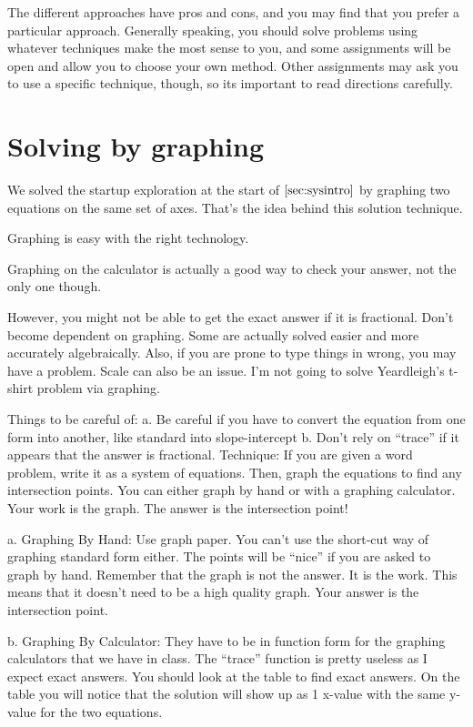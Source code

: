 The different approaches have pros and cons, and you may find that you prefer a particular approach. Generally speaking, you should solve problems using whatever techniques make the most sense to you, and some assignments will be open and allow you to choose your own method. Other assignments may ask you to use a specific technique, though, so its important to read directions carefully.

\section{Solving by graphing}
\label{sec:sysgraphing}

We solved the startup exploration at the start of $\cref{sec:sysintro}$ by graphing two equations on the same set of axes. That's the idea behind this solution technique.

Graphing is easy with the right technology.

Graphing on the calculator is actually a good way to check your answer, not the only one though.

However, you might not be able to get the exact answer if it is fractional. Don't become dependent on graphing. Some are actually solved easier and more accurately algebraically. Also, if you are prone to type things in wrong, you may have a problem. Scale can also be an issue. I'm not going to solve Yeardleigh's t-shirt problem via graphing.

Things to be careful of:
a. Be careful if you have to convert the equation from one form into another, like standard into slope-intercept
b. Don't rely on ``trace'' if it appears that the answer is fractional.
Technique: If you are given a word problem, write it as a system of equations. Then, graph the equations to find any intersection points. You can either graph by hand or with a graphing calculator. Your work is the graph. The answer is the intersection point!


a.
Graphing By Hand: Use graph paper. You can't use the short-cut way of graphing standard form either. The points will be ``nice'' if you are asked to graph by hand. Remember that the graph is not the answer. It is the work. This means that it doesn't need to be a high quality graph. Your answer is the intersection point.

b. Graphing By Calculator: They have to be in function form for the graphing calculators that we have in class. The ``trace'' function is pretty useless as I expect exact answers. You should look at the table to find exact answers. On the table you will notice that the solution will show up as 1 x-value with the same y-value for the two equations.

